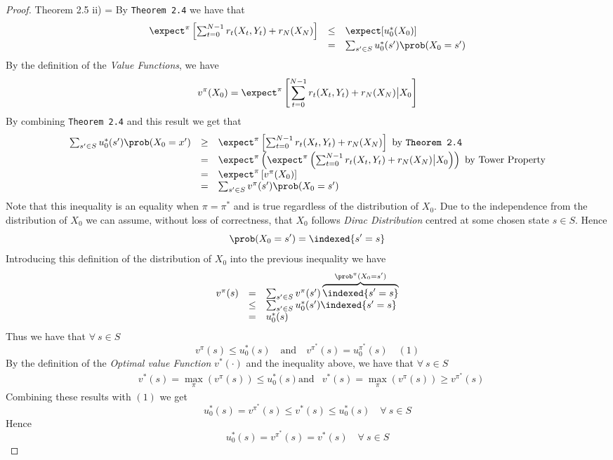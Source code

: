 \documentclass[11pt,a4paper]{article}
\begin{document}
  \begin{proof}{Theorem 2.5 ii)}
    \everymath={\displaystyle}
    By \texttt{Theorem 2.4}  we have that
    \[\begin{array}{rcl}
      \expect^\pi\left[\sum_{t=0}^{N-1}r_t(X_t,Y_t)+r_N(X_N)\right]&\leq&\expect[u_0^*(X_0)]\\
      &=&\sum_{s'\in S}u_0^*(s')\prob(X_0=s')
    \end{array}\]
    By the definition of the \textit{Value Functions}, we have
    \[ v^\pi(X_0)=\expect^\pi\left[\sum_{t=0}^{N-1}r_t(X_t,Y_t)+r_N(X_N)\big|X_0\right] \]
    By combining \texttt{Theorem 2.4} and this result we get that
    \[\begin{array}{rcl}
      \sum_{s'\in S}u_0^*(s')\prob(X_0=x')&\geq&\expect^\pi\left[\sum_{t=0}^{N-1}r_t(X_t,Y_t)+r_N(X_N)\right]\text{ by \texttt{Theorem 2.4}}\\
      &=&\expect^\pi\left(\expect^\pi\left(\sum_{t=0}^{N-1}r_t(X_t,Y_t)+r_N(X_N)\big|X_0\right)\right)\text{ by Tower Property}\\
      &=&\expect^\pi\left[v^\pi(X_0)\right]\\
      &=&\sum_{s'\in S}v^\pi(s')\prob(X_0=s')
    \end{array}\]
    Note that this inequality is an equality when $\pi=\pi^*$ and is true regardless of the distribution of $X_0$. Due to the independence from the distribution of $X_0$ we can assume, without loss of correctness, that $X_0$ follows \textit{Dirac Distribution} centred at some chosen state $s\in S$. Hence
    \[ \prob(X_0=s')=\indexed\{s'=s\} \]
    Introducing this definition of the distribution of $X_0$ into the previous inequality we have
    \[\begin{array}{rcl}
      v^\pi(s)&=&\sum_{s'\in S}v^\pi(s')\overbrace{\indexed\{s'=s\}}^{\prob^\pi(X_0=s')}\\
      &\leq&\sum_{s'\in S}u_0^*(s')\indexed\{s'=s\}\\
      &=&u_0^*(s)
    \end{array}\]
    Thus we have that $\forall\ s\in S$
    \[ v^\pi(s)\leq u_0^*(s)\quad\text{and}\quad v^{\pi^*}(s)=u_0^{\pi^*}(s)\quad(1) \]
    By the definition of the \textit{Optimal value Function} $v^*(\cdot)$ and the inequality above, we have that $\forall\ s\in S$
    \[\begin{array}{rl}
      &v^*(s)=\max_\pi(v^\pi(s))\leq u_0^*(s)
      \text{and}&v^*(s)=\max_\pi(v^\pi(s))\geq v^{\pi^*}(s)
    \end{array}\]
    Combining these results with $(1)$ we get
    \[ u_0^*(s)=v^{\pi^*}(s)\leq v^*(s)\leq u_0^*(s)\quad\forall\ s\in S \]
    Hence
    \[ u_0^*(s)=v^{\pi^*}(s)=v^*(s)\quad\forall\ s\in S \]
  \end{proof}
\end{document}
